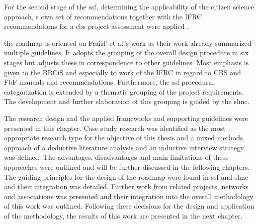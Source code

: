 For the second stage of the \acrshort*{ssf}, determining the applicability of the citizen science approach, \autocite{fraislCitizenScienceEnvironmental2022}s own set of recommendations together with the IFRC recommendations for a \acrshort*{cbs} project assessment were applied \autocite{goodermoteConductingAssessmentCommunitybased2020}.








the roadmap is oriented on Fraisl' et al.'s work as their work already summarized multiple guidelines. It adopts the grouping of the overall design procedure in six stages but adjusts these in correspondence to other guidelines. Most emphasis is given to the BRCiS and especially to work of the IFRC in regard to CBS and FbF manuals and recommendations. Furthermore, the \acrshort{ssf} procedural categorization is extended by a thematic grouping of the project requirements. The development and further elaboration of this grouping is guided by the \acrshort{slmc}.



The research design and the applied frameworks and supporting guidelines were presented in this chapter. Case study research was identified as the most appropriate research type for the objective of this thesis and a mixed methods approach of a deductive literature analysis and an inductive interview strategy was defined. The advantages, disadvantages and main limitations of these approaches were outlined and will be further discussed in the following chapters. The guiding principles for the design of the roadmap were found in \acrlong*{ssf} and \acrlong*{slmc} and their integration was detailed. Further work from related projects, networks and associations was presented and their integration into the overall methodology of this work was outlined. Following these decisions for the design and application of the methodology, the results of this work are presented in the next chapter.





















